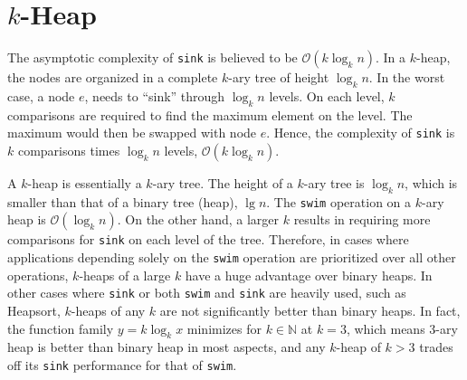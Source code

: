 \documentclass[titlepage, 12pt]{article}
\begin{document}
\section{\(k\)-Heap}
\label{sec:kheap}

The asymptotic complexity of \texttt{sink} is believed to be \(\mathcal{O}(k
\log_{k}{n})\). In a \(k\)-heap, the nodes are organized in a complete \(k\)-ary
tree of height \(\log_{k}{n}\). In the worst case, a node \(e\), needs to “sink”
through \(\log_{k}{n}\) levels. On each level, \(k\) comparisons are required to
find the maximum element on the level. The maximum would then be swapped with
node \(e\). Hence, the complexity of \texttt{sink} is \(k\) comparisons times
\(\log_{k}{n}\) levels, \(\mathcal{O}(k \log_{k}{n})\).

A \(k\)-heap is essentially a \(k\)-ary tree. The height of a \(k\)-ary tree is
\(\log_{k}{n}\), which is smaller than that of a binary tree (heap), \(\lg{n}\).
The \texttt{swim} operation on a \(k\)-ary heap is \(\mathcal{O}(\log_{k}{n})\).
On the other hand, a larger \(k\) results in requiring more comparisons for
\texttt{sink} on each level of the tree. Therefore, in cases where applications
depending solely on the \texttt{swim} operation are prioritized over all other
operations, \(k\)-heaps of a large \(k\) have a huge advantage over binary
heaps. In other cases where \texttt{sink} or both \texttt{swim} and
\texttt{sink} are heavily used, such as Heapsort, \(k\)-heaps of any \(k\) are
not significantly better than binary heaps. In fact, the function family \(y =
k\log_{k}{x}\) minimizes for \(k \in \mathbb{N}\) at \(k = 3\), which means
3-ary heap is better than binary heap in most aspects, and any \(k\)-heap of \(k
> 3\) trades off its \texttt{sink} performance for that of \texttt{swim}.
\end{document}
